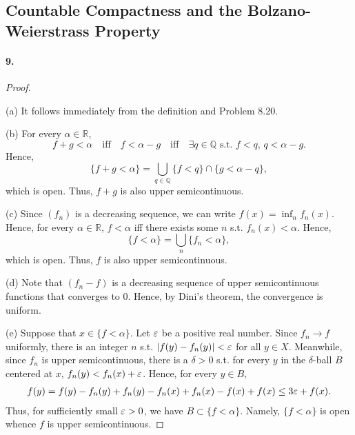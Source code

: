 \subsection{Countable Compactness and the Bolzano-Weierstrass Property}
\paragraph{9.}
\begin{proof}
  $\,$\par
  (a) It follows immediately from the definition and Problem 8.20.
  
  (b) For every $\alpha \in \mathbb{R}$,
  \[
    f + g < \alpha
    \quad\text{iff}\quad
    f < \alpha - g 
    \quad\text{iff}\quad 
    \exists q\in \mathbb{Q} \text{ s.t. } f < q,\, q < \alpha - g.
  \]
  Hence, 
  \[
    \{f + g < \alpha\} 
    = \bigcup_{q \in \mathbb{Q}} \{f < q\} \cap \{g < \alpha - q\},
  \]
  which is open. Thus, $f + g$ is also upper semicontinuous. 
  
  (c) Since $(f_n)$ is a decreasing sequence, we can write $f(x) = \inf_n
  f_n(x)$. Hence, for every $\alpha \in \mathbb{R}$, $f < \alpha$ iff there
  exists some $n$ s.t. $f_n(x) < \alpha$. Hence,
  \[
    \{f < \alpha\} = \bigcup_n \{f_n < \alpha\},
  \]
  which is open. Thus, $f$ is also upper semicontinuous. 
  
  (d) Note that $(f_n - f)$ is a decreasing sequence of upper semicontinuous
  functions that converges to $0$. Hence, by Dini's theorem, the convergence is
  uniform.
  
  (e) Suppose that $x \in \{f < \alpha\}$. Let $\varepsilon$ be a positive real
  number. Since $f_n \to f$ uniformly, there is an integer $n$ s.t. 
  $|f(y) - f_n(y)| < \varepsilon$ for all $y \in X$. Meanwhile, since $f_n$ is upper
  semicontinuous, there is a $\delta > 0$ s.t. for every $y$ in the
  $\delta$-ball $B$ centered at $x$, $f_n(y) < f_n(x) + \varepsilon$. Hence, for every
  $y \in B$,
  \begin{align*}
    f(y) = f(y) - f_n(y) + f_n(y) - f_n(x) + f_n(x) - f(x) + f(x) 
    \le 3\varepsilon + f(x). 
  \end{align*}
  Thus, for sufficiently small $\varepsilon > 0$, we have $B \subset \{f < \alpha\}$.
  Namely, $\{f < \alpha\}$ is open whence $f$ is upper semicontinuous. 
\end{proof}

